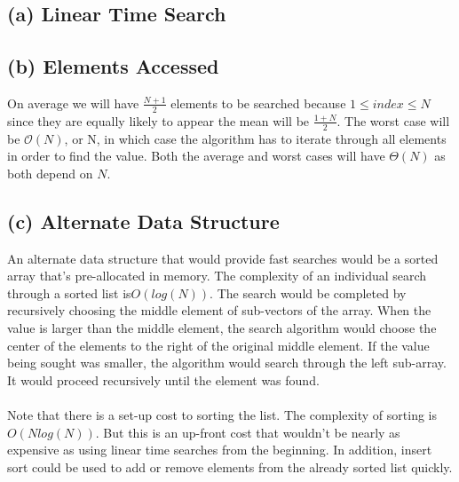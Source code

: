 \documentclass[]{../../ncmathy}
\begin{document}
\subsection{(a) Linear Time Search}
	

\subsection{(b) Elements Accessed}
On average we will have $\frac{N+1}{2}$ elements to be searched because $1 \leq index \leq N$ since they are equally likely to appear the mean will be $\frac{1+N}{2} $. The worst case will be $\mathcal{O}(N)$, or N, in which case the algorithm has to iterate through all elements in order to find the value. Both the average and worst cases will have $\Theta(N)$ as both depend on $N$.

\subsection{(c) Alternate Data Structure}
An alternate data structure that would provide fast searches would be a sorted array that's pre-allocated in memory. The complexity of an individual search through a sorted list is$O(log(N))$. The search would be completed by recursively choosing the middle element of sub-vectors of the array. When the value is larger than the middle element, the search algorithm would choose the center of the elements to the right of the original middle element. If the value being sought was smaller, the algorithm would search through the left sub-array. It would proceed recursively until the element was found.
\\\\
Note that there is a set-up cost to sorting the list. The complexity of sorting is $O(N log(N))$. But this is an up-front cost that wouldn't be nearly as expensive as using linear time searches from the beginning. In addition, insert sort could be used to add or remove elements from the already sorted list quickly.
\end{document}
